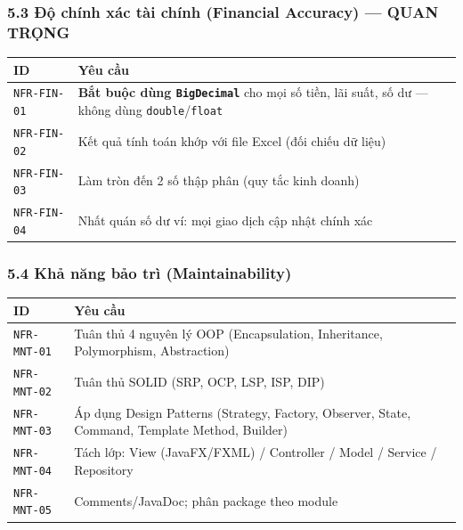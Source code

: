 \documentclass[11pt,a4paper]{article}
\newcounter{none}
\begin{document}
\subsubsection{5.3 Độ chính xác tài chính (Financial Accuracy) --- QUAN TRỌNG}\label{ux111ux1ed9-chuxednh-xuxe1c-tuxe0i-chuxednh-financial-accuracy-quan-trux1ecdng}

{\def\LTcaptype{none}
\begin{longtable}[]{@{}
  >{\raggedright\arraybackslash}p{}
  >{\raggedright\arraybackslash}p{}@{}}
\toprule\noalign{}
\begin{minipage}[b]{\linewidth}\raggedright
ID
\end{minipage} & \begin{minipage}[b]{\linewidth}\raggedright
Yêu cầu
\end{minipage} \\
\midrule\noalign{}
\endhead
\bottomrule\noalign{}
\endlastfoot
\texttt{NFR-FIN-01} & \textbf{Bắt buộc dùng \texttt{BigDecimal}} cho mọi số tiền, lãi suất, số dư --- không dùng \texttt{double}/\texttt{float} \\ 
\texttt{NFR-FIN-02} & Kết quả tính toán khớp với file Excel (đối chiếu dữ liệu) \\ 
\texttt{NFR-FIN-03} & Làm tròn đến 2 số thập phân (quy tắc kinh doanh) \\ 
\texttt{NFR-FIN-04} & Nhất quán số dư ví: mọi giao dịch cập nhật chính xác \\
\end{longtable}
}

\subsubsection{5.4 Khả năng bảo trì (Maintainability)}\label{khux1ea3-nux103ng-bux1ea3o-truxec-maintainability}

{\def\LTcaptype{none}
\begin{longtable}[]{@{}
  >{\raggedright\arraybackslash}p{}
  >{\raggedright\arraybackslash}p{}@{}}
\toprule\noalign{}
\begin{minipage}[b]{\linewidth}\raggedright
ID
\end{minipage} & \begin{minipage}[b]{\linewidth}\raggedright
Yêu cầu
\end{minipage} \\
\midrule\noalign{}
\endhead
\bottomrule\noalign{}
\endlastfoot
\texttt{NFR-MNT-01} & Tuân thủ 4 nguyên lý OOP (Encapsulation, Inheritance, Polymorphism, Abstraction) \\ 
\texttt{NFR-MNT-02} & Tuân thủ SOLID (SRP, OCP, LSP, ISP, DIP) \\ 
\texttt{NFR-MNT-03} & Áp dụng Design Patterns (Strategy, Factory, Observer, State, Command, Template Method, Builder) \\ 
\texttt{NFR-MNT-04} & Tách lớp: View (JavaFX/FXML) / Controller / Model / Service / Repository \\ 
\texttt{NFR-MNT-05} & Comments/JavaDoc; phân package theo module \\
\end{longtable}
}
\end{document}
